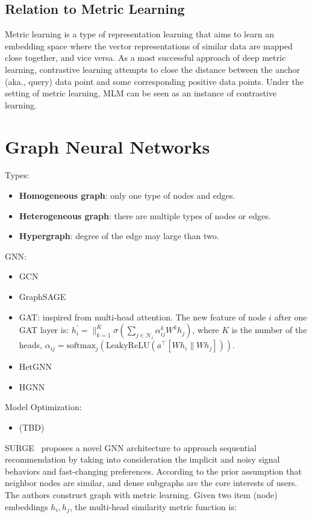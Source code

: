 \subsection{Relation to Metric Learning}

Metric learning is a type of representation learning that aims to learn an embedding space where the vector representations of similar data are mapped close together, and vice versa.
As a most successful approach of deep metric learning, contrastive learning attempts to close the distance between the anchor (aka., query) data point and some corresponding positive data points.
Under the setting of metric learning, MLM can be seen as an instance of contrastive learning.

\section{Graph Neural Networks}

Types:

\begin{itemize}
	\item \textbf{Homogeneous graph}: only one type of nodes and edges.
	\item \textbf{Heterogeneous graph}: there are multiple types of nodes or edges.
	\item \textbf{Hypergraph}: degree of the edge may large than two.
\end{itemize}

GNN:

\begin{itemize}
	\item GCN
	\item GraphSAGE
	\item GAT: inspired from multi-head attention. The new feature of node $i$ after one GAT layer is: $h_i^\prime = \parallel_{k=1}^K \sigma \left( \sum_{j \in \mathcal{N}_i} \alpha_{ij}^k W^k h_j \right)$, where $K$ is the number of the heads, $\alpha_{ij} = \text{softmax}_j (\text{LeakyReLU}(a^\top [Wh_i \parallel Wh_j]))$.
	\item HetGNN
	\item HGNN
\end{itemize}

Model Optimization:

\begin{itemize}
	\item (TBD)
\end{itemize}

SURGE~ proposes a novel GNN architecture to approach sequential recommendation by taking into consideration the implicit and noisy signal behaviors and fast-changing preferences.
According to the prior assumption that neighbor nodes are similar, and dense subgraphs are the core interests of users.
The authors construct graph with metric learning.
Given two item (node) embeddings $h_i, h_j$, the multi-head similarity metric function is:


